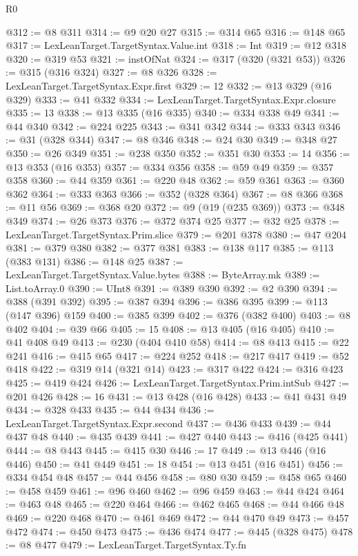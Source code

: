 \begin{lexlean}{R0}
\begin{coremodule}
@312 := @8 @311
@314 := @9 @20 @27
@315 := @314 @65
@316 := @148 @65
@317 := LexLeanTarget.TargetSyntax.Value.int
@318 := Int
@319 := @12 @318
@320 := @319 @53
@321 := instOfNat
@324 := @317 (@320 (@321 @53))
@326 := @315 (@316 @324)
@327 := @8 @326
@328 := LexLeanTarget.TargetSyntax.Expr.first
@329 := 12
@332 := @13 @329 (@16 @329)
@333 := @41 @332
@334 := LexLeanTarget.TargetSyntax.Expr.closure
@335 := 13
@338 := @13 @335 (@16 @335)
@340 := @334 @338 @49
@341 := @44 @340
@342 := @224 @225
@343 := @341 @342
@344 := @333 @343
@346 := @31 (@328 @344)
@347 := @8 @346
@348 := @24 @30
@349 := @348 @27
@350 := @26 @349
@351 := @238 @350
@352 := @351 @30
@353 := 14
@356 := @13 @353 (@16 @353)
@357 := @334 @356
@358 := @59 @49
@359 := @357 @358
@360 := @44 @359
@361 := @220 @48
@362 := @59 @361
@363 := @360 @362
@364 := @333 @363
@366 := @352 (@328 @364)
@367 := @8 @366
@368 := @11 @56
@369 := @368 @20
@372 := @9 (@19 (@235 @369))
@373 := @348 @349
@374 := @26 @373
@376 := @372 @374 @25
@377 := @32 @25
@378 := LexLeanTarget.TargetSyntax.Prim.slice
@379 := @201 @378
@380 := @47 @204
@381 := @379 @380
@382 := @377 @381
@383 := @138 @117
@385 := @113 (@383 @131)
@386 := @148 @25
@387 := LexLeanTarget.TargetSyntax.Value.bytes
@388 := ByteArray.mk
@389 := List.toArray.{0}
@390 := UInt8
@391 := @389 @390
@392 := @2 @390
@394 := @388 (@391 @392)
@395 := @387 @394
@396 := @386 @395
@399 := @113 (@147 @396) @159
@400 := @385 @399
@402 := @376 (@382 @400)
@403 := @8 @402
@404 := @39 @66
@405 := 15
@408 := @13 @405 (@16 @405)
@410 := @41 @408 @49
@413 := @230 (@404 @410 @58)
@414 := @8 @413
@415 := @22 @241
@416 := @415 @65
@417 := @224 @252
@418 := @217 @417
@419 := @52 @418
@422 := @319 @14 (@321 @14)
@423 := @317 @422
@424 := @316 @423
@425 := @419 @424
@426 := LexLeanTarget.TargetSyntax.Prim.intSub
@427 := @201 @426
@428 := 16
@431 := @13 @428 (@16 @428)
@433 := @41 @431 @49
@434 := @328 @433
@435 := @44 @434
@436 := LexLeanTarget.TargetSyntax.Expr.second
@437 := @436 @433
@439 := @44 @437 @48
@440 := @435 @439
@441 := @427 @440
@443 := @416 (@425 @441)
@444 := @8 @443
@445 := @415 @30
@446 := 17
@449 := @13 @446 (@16 @446)
@450 := @41 @449
@451 := 18
@454 := @13 @451 (@16 @451)
@456 := @334 @454 @48
@457 := @44 @456
@458 := @80 @30
@459 := @458 @65
@460 := @458 @459
@461 := @96 @460
@462 := @96 @459
@463 := @44 @424
@464 := @463 @48
@465 := @220 @464
@466 := @462 @465
@468 := @44 @466 @48
@469 := @220 @468
@470 := @461 @469
@472 := @44 @470 @49
@473 := @457 @472
@474 := @450 @473
@475 := @436 @474
@477 := @445 (@328 @475)
@478 := @8 @477
@479 := LexLeanTarget.TargetSyntax.Ty.fn

\end{coremodule}
\end{lexlean}
